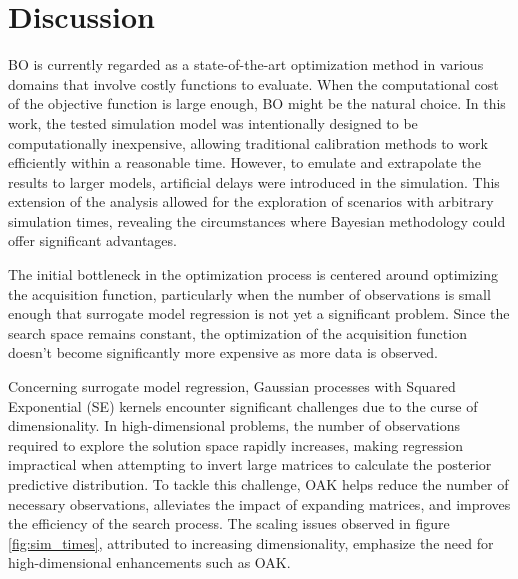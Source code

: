 \documentclass[sn-mathphys,Numbered]{sn-jnl}%
\begin{document}
\section{Discussion}
BO is currently regarded as a state-of-the-art optimization method in various domains that involve costly functions to evaluate. When the computational cost of the objective function is large enough, BO might be the natural choice. In this work, the tested simulation model was intentionally designed to be computationally inexpensive, allowing traditional calibration methods to work efficiently within a reasonable time. However, to emulate and extrapolate the results to larger models, artificial delays were introduced in the simulation. This extension of the analysis allowed for the exploration of scenarios with arbitrary simulation times, revealing the circumstances where Bayesian methodology could offer significant advantages.

The initial bottleneck in the optimization process is centered around optimizing the acquisition function, particularly when the number of observations is small enough that surrogate model regression is not yet a significant problem. Since the search space remains constant, the optimization of the acquisition function doesn't become significantly more expensive as more data is observed.

Concerning surrogate model regression, Gaussian processes with Squared Exponential (SE) kernels encounter significant challenges due to the curse of dimensionality. In high-dimensional problems, the number of observations required to explore the solution space rapidly increases, making regression impractical when attempting to invert large matrices to calculate the posterior predictive distribution. To tackle this challenge, OAK helps reduce the number of necessary observations, alleviates the impact of expanding matrices, and improves the efficiency of the search process. The scaling issues observed in figure \ref{fig:sim_times}, attributed to increasing dimensionality, emphasize the need for high-dimensional enhancements such as OAK.
\end{document}
